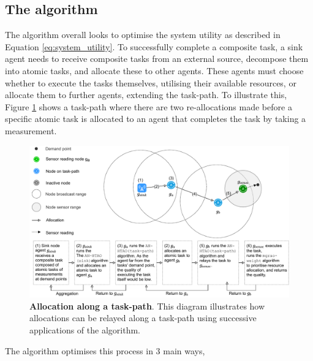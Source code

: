 \newcommand{\functionANHTAO}[2]{
	\functionSignature{\texttt{anhtao-path}}{\varAtomicTask{}{}, \varAgent{}{}}
}

\subsection{The \acronymWSNOptimisationExtended{}{} algorithm}
\label{section:solution_anhtao}

The \acronymWSNOptimisation{}{} algorithm overall looks to optimise the system utility as described in Equation \ref{eq:system_utility}. 
To successfully complete a composite task, a sink agent needs to receive composite tasks from an external source, decompose them into atomic tasks, and allocate these to other agents. These agents must choose whether to execute the tasks themselves, utilising their available resources, or allocate them to further agents, extending the task-path.  To illustrate this, Figure \ref{fig:arc-flow} shows a task-path where there are two re-allocations made before a specific atomic task is allocated to an agent that completes the task by taking a measurement.
\begin{figure}[ht]
	\centering
	\includegraphics[width=0.8\linewidth, trim={72pt 0pt 62pt 0pt, clip}]{arc-flow}
	\caption{\textbf{Allocation along a task-path}. This diagram illustrates how allocations can be relayed along a task-path using successive applications of the \acronymATARIA{}{} algorithm.}
	\label{fig:arc-flow}
\end{figure}
The \acronymWSNOptimisation{}{} algorithm optimises this process  in 3 main ways,
